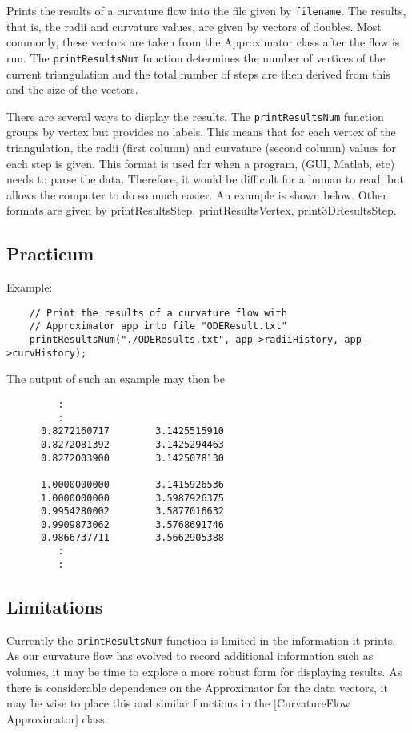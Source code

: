 \documentclass[10pt]{article}%
\begin{document}
Prints the results of a curvature flow into the file given by
\texttt{filename}. The results, that is, the radii and curvature values, are
given by vectors of doubles. Most commonly, these vectors are taken
from the Approximator class after the flow is run. The
\texttt{printResultsNum} function determines the number of vertices of the
current triangulation and the total number of steps are then derived
from this and the size of the vectors.

There are several ways to display the results. The \texttt{printResultsNum}
function groups by vertex but provides no labels. This means that for
each vertex of the triangulation, the radii (first column) and
curvature (second column) values for each step is given. This format
is used for when a program, (GUI, Matlab, etc) needs to parse the
data. Therefore, it would be difficult for a human to read, but allows
the computer to do so much easier. An example is shown below. Other
formats are given by printResultsStep, printResultsVertex,
print3DResultsStep.

\subsection*{Practicum}

Example: 
{\small{\begin{verbatim}  
    // Print the results of a curvature flow with
    // Approximator app into file "ODEResult.txt"
    printResultsNum("./ODEResults.txt", app->radiiHistory, app->curvHistory); 
\end{verbatim}
}}
The output of such an example may then be
{\small{\begin{verbatim} 
         :
         :
      0.8272160717        3.1425515910
      0.8272081392        3.1425294463
      0.8272003900        3.1425078130

      1.0000000000        3.1415926536
      1.0000000000        3.5987926375
      0.9954280002        3.5877016632
      0.9909873062        3.5768691746
      0.9866737711        3.5662905388
         :
         :
\end{verbatim}
}}

\subsection*{Limitations}

Currently the \texttt{printResultsNum} function is limited in the information
it prints. As our curvature flow has evolved to record additional
information such as volumes, it may be time to explore a more robust
form for displaying results. As there is considerable dependence on
the Approximator for the data vectors, it may be wise
to place this and similar functions in the \mbox{$[$}CurvatureFlow
Approximator\mbox{$]$} class.
\end{document}

